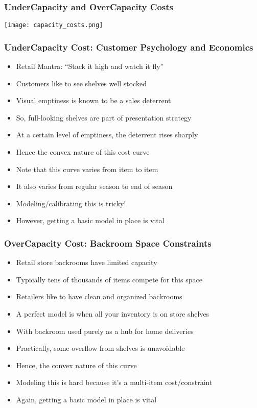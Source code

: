 \documentclass[handout]{beamer}
\begin{document}
\begin{frame}
\frametitle{UnderCapacity and OverCapacity Costs}
\texttt{[image: capacity\_costs.png]}
\end{frame}

\begin{frame}
\frametitle{UnderCapacity Cost: Customer Psychology and Economics}
\pause
\begin{itemize}[<+->]
\item Retail Mantra: ``Stack it high and watch it fly''
\item Customers like to see shelves well stocked
\item Visual emptiness is known to be a sales deterrent
\item So, full-looking shelves are part of presentation strategy
\item At a certain level of emptiness, the deterrent rises sharply
\item Hence the convex nature of this cost curve
\item Note that this curve varies from item to item
\item It also varies from regular season to end of season
\item Modeling/calibrating this is tricky!
\item However, getting a basic model in place is vital
\end{itemize}
\end{frame}

\begin{frame}
\frametitle{OverCapacity Cost: Backroom Space Constraints}
\pause
\begin{itemize}[<+->]
\item Retail store backrooms have limited capacity
\item Typically tens of thousands of items compete for this space
\item Retailers like to have clean and organized backrooms
\item A perfect model is when all your inventory is on store shelves
\item With backroom used purely as a hub for home deliveries
\item Practically, some overflow from shelves is unavoidable
\item Hence, the convex nature of this curve
\item Modeling this is hard because it's a multi-item cost/constraint
\item Again, getting a basic model in place is vital
\end{itemize}
\end{frame}
\end{document}

